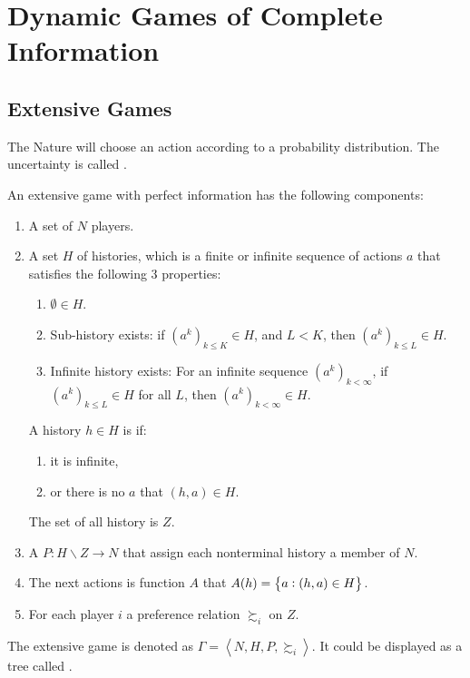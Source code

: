 \section{Dynamic Games of Complete Information}

\subsection{Extensive Games}

\begin{definition}
    The Nature will choose an action according to a probability distribution. The uncertainty is called .
\end{definition}

\begin{definition}
    An extensive game with perfect information has the following components:
    \begin{enumerate}
        \item A set of $N$ players.
        \item A set $H$ of histories, which is a finite or infinite sequence of actions $a$ that satisfies the following 3 properties:
            \begin{enumerate}
                \item $\emptyset \in H$.
                \item Sub-history exists: if $(a^k)_{k \leq K} \in H$, and $L < K$, then $(a^k)_{k \leq L} \in H$.
                \item Infinite history exists: For an infinite sequence $(a^k)_{k < \infty}$, if $(a^k)_{k \leq L} \in H$ for all $L$, then $(a^k)_{k < \infty} \in H$.
            \end{enumerate}
            A history $h \in H$ is  if:
            \begin{enumerate}
                \item it is infinite,
                \item or there is no $a$ that $(h, a) \in H$.
            \end{enumerate}
            The set of all  history is $Z$.
        \item A  $P: H\backslash Z \rightarrow N$ that assign each nonterminal history a member of $N$.
        \item The next actions is function $A$ that $A(h) = \set{a: (h, a) \in H}$.
        \item For each player $i$ a preference relation $\succsim_i$ on $Z$.
    \end{enumerate}
    The extensive game is denoted as $\Gamma = \left\langle N, H, P, \succsim_i \right\rangle$. It could be displayed as a tree called .
\end{definition}

